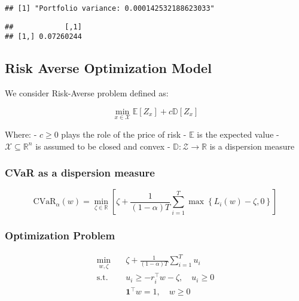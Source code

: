 \documentclass[
]{article}
\newenvironment{Shaded}{\begin{snugshade}}{\end{snugshade}}
\newcommand{\DecValTok}[1]{\textcolor[rgb]{0.00,0.00,0.81}{#1}}
\newcommand{\FunctionTok}[1]{\textcolor[rgb]{0.13,0.29,0.53}{\textbf{#1}}}
\newcommand{\NormalTok}[1]{#1}
\newcommand{\SpecialCharTok}[1]{\textcolor[rgb]{0.81,0.36,0.00}{\textbf{#1}}}
\begin{document}
\begin{verbatim}
## [1] "Portfolio variance: 0.000142532188623033"
\end{verbatim}

\begin{Shaded}
\end{Shaded}

\begin{verbatim}
##            [,1]
## [1,] 0.07260244
\end{verbatim}

\subsection{Risk Averse Optimization
Model}\label{risk-averse-optimization-model}

We consider Risk-Averse problem defined as:

\[
\min_{x \in \mathcal{X}}\mathbb{E}[Z_x] + c\mathbb{D}[Z_x]
\]

Where: - \(c \geq 0\) plays the role of the price of risk -
\(\mathbb{E}\) is the expected value -
\(\mathcal{X} \subseteq \mathbb{R}^n\) is assumed to be closed and
convex - \(\mathbb{D}: \mathcal{Z} \rightarrow \mathbb{R}\) is a
dispersion measure

\subsubsection{CVaR as a dispersion
measure}\label{cvar-as-a-dispersion-measure}

\[
  \text{CVaR}_\alpha(w) = \min_{\zeta \in \mathbb{R}} \left[ \zeta + \frac{1}{(1 - \alpha)T} \sum_{i=1}^T \max\left\{ L_i(w) - \zeta, 0 \right\} \right]
\]

\subsubsection{Optimization Problem}\label{optimization-problem}

\[
\begin{aligned}
\min_{w, \zeta} \quad & \zeta + \frac{1}{(1 - \alpha)T} \sum_{i=1}^T u_i \\
\text{s.t.} \quad & u_i \ge -r_i^\top w - \zeta,\quad u_i \ge 0 \\
& \mathbf{1}^\top w = 1,\quad w \ge 0 \\
\end{aligned}
\]
\end{document}
